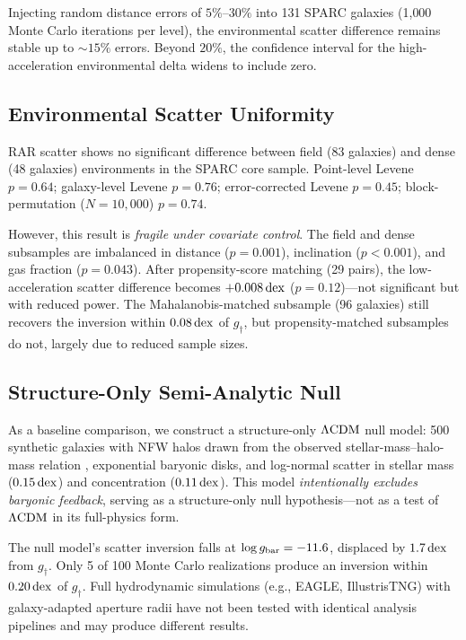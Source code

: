 \documentclass[twocolumn,twocolappendix]{aastex631}
\newcommand{\gbar}{g_{\rm bar}}
\newcommand{\gdag}{g_{\dagger}}
\newcommand{\dex}{\,{\rm dex}}
\newcommand{\lcdm}{\Lambda{\rm CDM}}
\begin{document}
Injecting random distance errors of $5\%$--$30\%$ into 131 SPARC galaxies
(1{,}000 Monte Carlo iterations per level), the environmental scatter
difference remains stable up to $\sim\!15\%$ errors. Beyond $20\%$, the
confidence interval for the high-acceleration environmental delta widens to
include zero.

\subsection{Environmental Scatter Uniformity} \label{sec:env_scatter}

RAR scatter shows no significant difference between field (83 galaxies) and
dense (48 galaxies) environments in the SPARC core sample. Point-level
Levene $p = 0.64$; galaxy-level Levene $p = 0.76$; error-corrected Levene
$p = 0.45$; block-permutation ($N = 10{,}000$) $p = 0.74$.

However, this result is \emph{fragile under covariate control}. The field
and dense subsamples are imbalanced in distance ($p = 0.001$), inclination
($p < 0.001$), and gas fraction ($p = 0.043$). After propensity-score
matching (29 pairs), the low-acceleration scatter difference becomes
$+0.008\dex$ ($p = 0.12$)---not significant but with reduced power. The
Mahalanobis-matched subsample (96 galaxies) still recovers the inversion
within $0.08\dex$ of $\gdag$, but propensity-matched subsamples do not,
largely due to reduced sample sizes.

\subsection{Structure-Only Semi-Analytic Null} \label{sec:lcdm_null}

As a baseline comparison, we construct a structure-only $\lcdm$ null model:
500 synthetic galaxies with NFW halos drawn from the observed
stellar-mass--halo-mass relation \citep{Ludlow2017}, exponential baryonic
disks, and log-normal scatter in stellar mass ($0.15\dex$) and concentration
($0.11\dex$). This model \emph{intentionally excludes baryonic feedback},
serving as a structure-only null hypothesis---not as a test of $\lcdm$ in
its full-physics form.

The null model's scatter inversion falls at $\log\gbar = -11.6$, displaced
by $1.7\dex$ from $\gdag$. Only 5 of 100 Monte Carlo realizations produce
an inversion within $0.20\dex$ of $\gdag$. Full hydrodynamic simulations
(e.g., EAGLE, IllustrisTNG) with galaxy-adapted aperture radii have not
been tested with identical analysis pipelines and may produce different
results.
\end{document}
